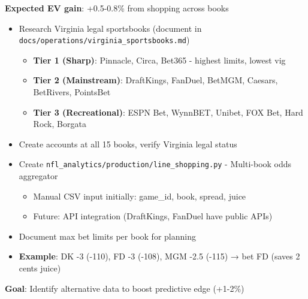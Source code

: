 \textbf{Expected EV gain}: +0.5-0.8\% from shopping across books

\begin{itemize}
  \item {} Research Virginia legal sportsbooks (document in \texttt{docs/operations/virginia\_sportsbooks.md})
  \begin{itemize}
    \item \textbf{Tier 1 (Sharp)}: Pinnacle, Circa, Bet365 - highest limits, lowest vig
    \item \textbf{Tier 2 (Mainstream)}: DraftKings, FanDuel, BetMGM, Caesars, BetRivers, PointsBet
    \item \textbf{Tier 3 (Recreational)}: ESPN Bet, WynnBET, Unibet, FOX Bet, Hard Rock, Borgata
  \end{itemize}
  \item {} Create accounts at all 15 books, verify Virginia legal status
  \item {} Create \texttt{nfl\_analytics/production/line\_shopping.py} - Multi-book odds aggregator
  \begin{itemize}
    \item Manual CSV input initially: game\_id, book, spread, juice
    \item Future: API integration (DraftKings, FanDuel have public APIs)
  \end{itemize}
  \item {} Document max bet limits per book for planning
  \item \textbf{Example}: DK -3 (-110), FD -3 (-108), MGM -2.5 (-115) → bet FD (saves 2 cents juice)
\end{itemize}

\textbf{Goal}: Identify alternative data to boost predictive edge (+1-2\%)

